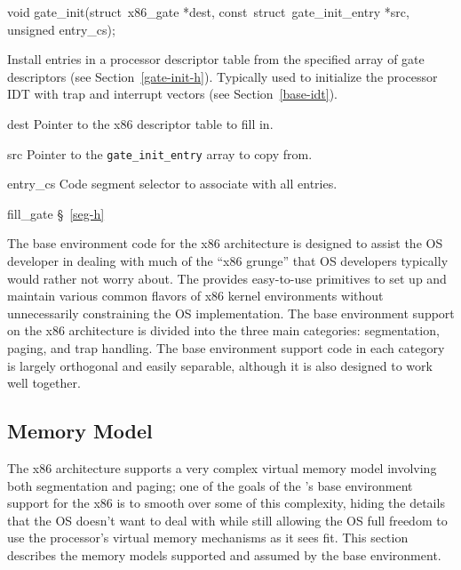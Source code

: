\label{gate-init}
\begin{apisyn}

	\funcproto void gate_init(struct~x86_gate *dest,
		const~struct~gate_init_entry *src, unsigned entry_cs);
\end{apisyn}
\begin{apidesc}
	Install entries in a processor descriptor table
	from the specified array of gate descriptors
	(see Section~\ref{gate-init-h}).
	Typically used to initialize the processor IDT with trap and interrupt
	vectors (see Section~\ref{base-idt}).
\end{apidesc}
\begin{apiparm}
	\item[dest]
		Pointer to the x86 descriptor table to fill in.
	\item[src]
		Pointer to the {\tt gate_init_entry} array to copy from.
	\item[entry_cs]
		Code segment selector to associate with all entries.
\end{apiparm}
\begin{apidep}
	\item[fill_gate]	\S~\ref{seg-h}
\end{apidep}


\label{kern-x86-base}
\label{kern-x86-base-firstsection}

The base environment code for the x86 architecture
is designed to assist the OS developer
in dealing with much of the ``x86 grunge''
that OS developers typically would rather not worry about.
The \oskit{} provides easy-to-use primitives
to set up and maintain various common flavors of x86 kernel environments
without unnecessarily constraining the OS implementation.
The base environment support on the x86 architecture is divided
into the three main categories:
segmentation, paging, and trap handling.
The base environment support code in each category
is largely orthogonal and easily separable,
although it is also designed to work well together.

\subsection{Memory Model}

The x86 architecture supports a very complex virtual memory model
involving both segmentation and paging;
one of the goals of the \oskit{}'s base environment support for the x86
is to smooth over some of this complexity,
hiding the details that the OS doesn't want to deal with
while still allowing the OS full freedom
to use the processor's virtual memory mechanisms as it sees fit.
This section describes
the memory models supported and assumed by the base environment.

